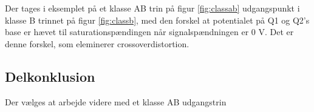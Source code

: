 Der tages i eksemplet på et klasse AB trin på figur \ref{fig:classab} udgangspunkt i klasse B trinnet på figur \ref{fig:classb}, med den forskel at potentialet på Q1 og Q2's base er hævet til saturationspændingen når signalspændningen er 0 V. Det er denne forskel, som eleminerer crossoverdistortion.


\subsection{Delkonklusion}

Der vælges at arbejde videre med et klasse AB udgangstrin 
